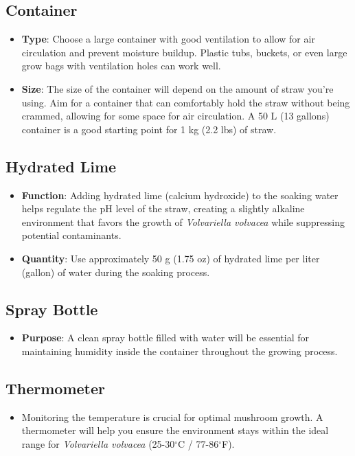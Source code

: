 \subsection{Container}
\begin{itemize}
    \item \textbf{Type}: Choose a large container with good ventilation to allow for air circulation and prevent moisture buildup. Plastic tubs, buckets, or even large grow bags with ventilation holes can work well.
    \item \textbf{Size}: The size of the container will depend on the amount of straw you're using. Aim for a container that can comfortably hold the straw without being crammed, allowing for some space for air circulation. A 50 L (13 gallons) container is a good starting point for 1 kg (2.2 lbs) of straw.
\end{itemize}
\subsection{Hydrated Lime}
\begin{itemize}
    \item \textbf{Function}: Adding hydrated lime (calcium hydroxide) to the soaking water helps regulate the pH level of the straw, creating a slightly alkaline environment that favors the growth of \textit{Volvariella volvacea} while suppressing potential contaminants.
    \item \textbf{Quantity}: Use approximately 50 g (1.75 oz) of hydrated lime per liter (gallon) of water during the soaking process.
\end{itemize}
\subsection{Spray Bottle}
\begin{itemize}
    \item \textbf{Purpose}: A clean spray bottle filled with water will be essential for maintaining humidity inside the container throughout the growing process.
\end{itemize}
\subsection{Thermometer}
\begin{itemize}
    \item Monitoring the temperature is crucial for optimal mushroom growth. A thermometer will help you ensure the environment stays within the ideal range for \textit{Volvariella volvacea} (25-30$^\circ$C / 77-86$^\circ$F).
\end{itemize}

